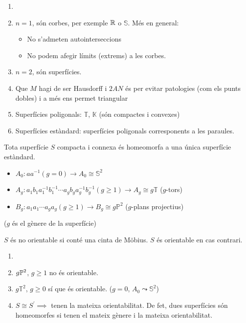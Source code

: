 \begin{example}
	\begin{enumerate}
		\item[]
		\item $n = 1$, són corbes, per exemple $\mathbb{R}$ o $\mathbb{S}$. Més en general:
			\begin{itemize}
				\item No s'admeten autointerseccions
				\item No podem afegir límits (extrems) a les corbes.
			\end{itemize}
		\item $n = 2$, són superfícies.
		\item Que $M$ hagi de ser Hausdorff i $2AN$ és per evitar patologies (com els punts
			dobles) i a més ens permet triangular
		\item Superfícies poligonals: $\mathbb{T}$, $\mathbb{K}$ (són compactes i convexes)
		\item Superfícies estàndard: superfícies poligonals corresponents a les paraules.
	\end{enumerate}
\end{example}

\begin{teo*}
	Tota superfície $S$ compacta i connexa és homeomorfa a una única superfície estàndard.
	\begin{itemize}
		\item $A_0 \colon aa^{-1} (g = 0) \rightarrow A_0 \cong \mathbb{S}^2$
		\item $A_g \colon a_1b_1a^{-1}_1 b^{-1}_1 \cdots a_gb_ga^{-1}_gb^{-1}_g (g \geq 1)
			\rightarrow A_g \cong g \mathbb{T}$ ($g$-tors)
		\item $B_g \colon a_1a_1 \cdots a_ga_g (g \geq 1) \rightarrow B_g \cong g \mathbb{P}^2$
			($g$-plans projectius)
	\end{itemize}
	($g$ és el gènere de la superfície)
\end{teo*}

\begin{defi}[Orientabilitat]
	$S$ és no orientable si conté una cinta de Möbius. $S$ és orientable en cas contrari.
\end{defi}

\begin{example}
	\begin{enumerate}
		\item[]
		\item $g \mathbb{P}^2$, $g \geq 1$ no és orientable.
		\item $g \mathbb{T}^2$, $g \geq 0$ sí que és orientable. ($g = 0$, $A_0 \leadsto \mathbb{S}^2$)
		\item $S \cong S^\prime \implies $ tenen la mateixa orientabilitat. De fet, dues superfícies
			són homeomorfes si tenen el mateix gènere i la mateixa orientabilitat.
	\end{enumerate}
\end{example}


